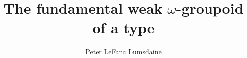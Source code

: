 \documentclass{amsart}
\begin{document}

\title{The fundamental weak $\omega$-groupoid of a type}

\author[P. LeF. Lumsdaine]{Peter LeFanu Lumsdaine}

\maketitle
\tableofcontents







\clearpage




\end{document}
